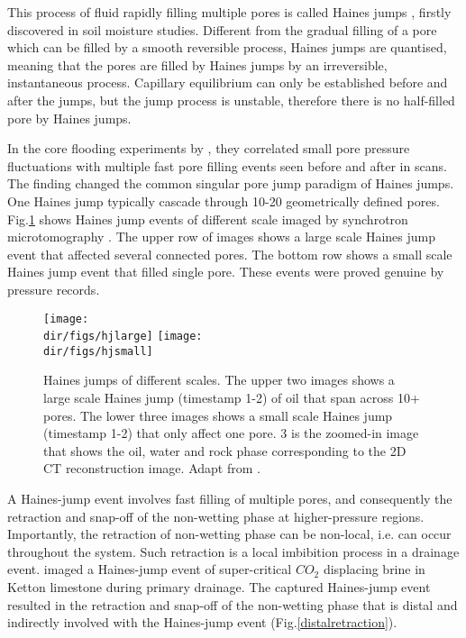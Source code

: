 This process of fluid rapidly filling multiple pores is called Haines jumps \citep{haines1930studies}, firstly discovered in soil moisture studies. Different from the gradual filling of a pore which can be filled by a smooth reversible process, Haines jumps are quantised, meaning that the pores are filled by Haines jumps by an irreversible, instantaneous process. Capillary equilibrium can only be established before and after the jumps, but the jump process is unstable, therefore there is no half-filled pore by Haines jumps.

In the core flooding experiments by \citet{berg2013real}, they correlated small pore pressure fluctuations with multiple fast pore filling events seen before and after in scans. The finding changed the common singular pore jump paradigm of Haines jumps. One Haines jump typically cascade through 10-20 geometrically defined pores. Fig.\ref{hj} shows Haines jump events of different scale imaged by synchrotron microtomography \citep{berg2013real}. The upper row of images shows a large scale Haines jump event that affected several connected pores. The bottom row shows a small scale Haines jump event that filled single pore. These events were proved genuine by pressure records.

\begin{figure}[htbp]
  \centering
  \texttt{[image: \\dir/figs/hjlarge]}
  \texttt{[image: \\dir/figs/hjsmall]}
  \caption{Haines jumps of different scales. The upper two images shows a large scale Haines jump (timestamp 1-2) of oil that span across 10+ pores. The lower three images shows a small scale Haines jump (timestamp 1-2) that only affect one pore. 3 is the zoomed-in image that shows the oil, water and rock phase corresponding to the 2D CT reconstruction image. Adapt from \citet{berg2013real}.}
  \label{hj}
\end{figure}

A Haines-jump event involves fast filling of multiple pores, and consequently the retraction and snap-off of the non-wetting phase at higher-pressure regions. Importantly, the retraction of non-wetting phase can be non-local, i.e. can occur throughout the system. Such retraction is a local imbibition process in a drainage event. \citet{andrew2015imaging} imaged a Haines-jump event of super-critical $CO_2$ displacing brine in Ketton limestone during primary drainage. The captured Haines-jump event resulted in the retraction and snap-off of the non-wetting phase that is distal and indirectly involved with the Haines-jump event (Fig.\ref{distalretraction}).


